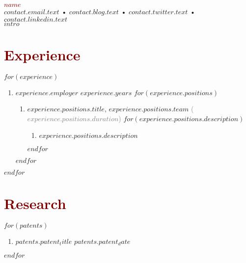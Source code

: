 \documentclass[$fontsize$, a4paper]{article}
\begin{document}
\textcolor{Maroon}{\LARGE \textbf{$name$}}\\[.3cm]
\textcolor{Gray}{} \href{mailto:$contact.email.url$}{$contact.email.text$} • \textcolor{OliveDrab}{} \href{$contact.blog.url$}{$contact.blog.text$} • \textcolor{MediumTurquoise}{} \href{$contact.twitter.url$}{$contact.twitter.text$} • \textcolor{SteelBlue}{} \href{$contact.linkedin.url$}{$contact.linkedin.text$}\\[.3cm]
$intro$

\section*{\textcolor{Maroon}{Experience}}
$for(experience)$
  \begin{enumerate}
    [topsep=10pt,itemsep=0pt,parsep=0pt,partopsep=0pt,leftmargin=10pt,label=•]
    \item{{\textbf{$experience.employer$}} \hfill $experience.years$}
    $for(experience.positions)$
    \begin{enumerate}
      [topsep=0pt,itemsep=0pt,parsep=0pt,partopsep=0pt,leftmargin=10pt,label=•]
      \item{{\textbf{$experience.positions.title$}}, {\textbf{$experience.positions.team$}}} \hfill \textcolor{Gray}{(\footnotesize{$experience.positions.duration$})}
      $for(experience.positions.description)$
        \begin{enumerate}
        [topsep=0pt,itemsep=0pt,parsep=0pt,partopsep=0pt,leftmargin=10pt,label=•]
        \item{$experience.positions.description$}
        \end{enumerate}
      $endfor$
    \end{enumerate}
    $endfor$
  \end{enumerate}
$endfor$

\section*{\textcolor{Maroon}{Research}}
$for(patents)$
  \begin{enumerate}
    [topsep=0pt,itemsep=0pt,parsep=0pt,partopsep=0pt,leftmargin=10pt,label=•]
    \item{\href{$patents.patent_url$}{$patents.patent_title$} \hfill $patents.patent_date$}
  \end{enumerate}
$endfor$
\end{document}
